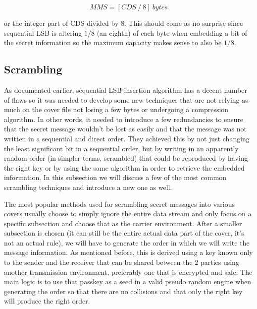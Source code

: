 \begin{multicols*}{2}
\[ MMS = [CDS \ / \ 8] \ bytes \]

or the integer part of CDS divided by 8. This should come as no surprise since sequential LSB is altering $1/8$ (an eighth) of each byte when embedding a bit of the secret information so the maximum capacity makes sense to also be $1/8$.


\subsection{Scrambling} \label{scrambling_chapter}
As documented earlier, sequential LSB insertion algorithm has a decent number of flaws so it was needed to develop some new techniques that are not relying as much on the cover file not losing a few bytes or undergoing a compression algorithm. In other words, it needed to introduce a few redundancies to ensure that the secret message wouldn't be lost as easily and that the message was not written in a sequential and direct order. They achieved this by not just changing the least significant bit in a sequential order, but by writing in an apparently random order (in simpler terms, scrambled) that could be reproduced by having the right key or by using the same algorithm in order to retrieve the embedded information. In this subsection we will discuss a few of the most common scrambling techniques and introduce a new one as well.

The most popular methods used for scrambling secret messages into various covers usually choose to simply ignore the entire data stream and only focus on a specific subsection and choose that as the carrier environment. After a smaller subsection is chosen (it can still be the entire actual data part of the cover, it's not an actual rule), we will have to generate the order in which we will write the message information. As mentioned before, this is derived using a key known only to the sender and the receiver that can be shared between the 2 parties using another transmission environment, preferably one that is encrypted and safe. The main logic is to use that passkey as a seed in a valid pseudo random engine when generating the order so that there are no collisions and that only the right key will produce the right order. 


\end{multicols*}
